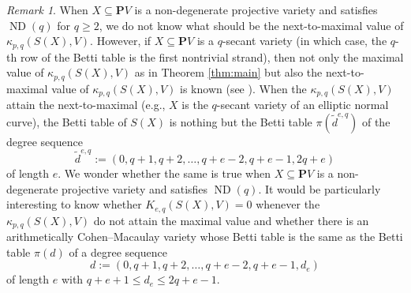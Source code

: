 \documentclass[12pt]{amsart}
\theoremstyle{definition}
\theoremstyle{remark}
\theoremstyle{corollary}
\theoremstyle{theorem}
\theoremstyle{corollary}
\theoremstyle{corollary}
\theoremstyle{definition}
\theoremstyle{remark}
\newtheorem{remark}[theorem]{Remark}
\numberwithin{equation}{section}
\def\nP{\mathbf{P}}
\DeclareMathOperator{\ND}{ND}
\begin{document}
\begin{remark}
When $X \subseteq \nP V$ is a non-degenerate projective variety and satisfies $\ND(q)$ for $q \geq 2$, we do not know what should be the next-to-maximal value of $\kappa_{p,q}(S(X), V)$. However, if $X \subseteq \nP V$ is a $q$-secant variety (in which case, the $q$-th row of the Betti table is the first nontrivial strand), then not only the maximal value of $\kappa_{p,q}(S(X), V)$ as in Theorem \ref{thm:main} but also the next-to-maximal value of $\kappa_{p,q}(S(X), V)$ is known (see \cite{CK}). When the $\kappa_{p,q}(S(X), V)$ attain the next-to-maximal (e.g., $X$ is the $q$-secant variety of an elliptic normal curve), the Betti table of $S(X)$ is nothing but the Betti table $\pi(\widetilde{d}^{e,q})$ of the degree sequence 
$$
\widetilde{d}^{e,q} := (0, q+1, q+2, \ldots, q+e-2, q+e-1, 2q+e)
$$
of length $e$. We wonder whether the same is true when $X \subseteq \nP V$ is a non-degenerate projective variety and satisfies $\ND(q)$. It would be particularly interesting to know whether $K_{e,q}(S(X), V)=0$ whenever the $\kappa_{p,q}(S(X), V)$ do not attain the maximal value and whether there is an arithmetically Cohen--Macaulay variety whose Betti table is the same as the Betti table $\pi(d)$ of a degree sequence 
$$
d:=(0,q+1, q+2, \ldots, q+e-2, q+e-1, d_e)
$$
of length $e$ with $q+e+1 \leq d_e \leq 2q+e-1$.
\end{remark}
\end{document}
